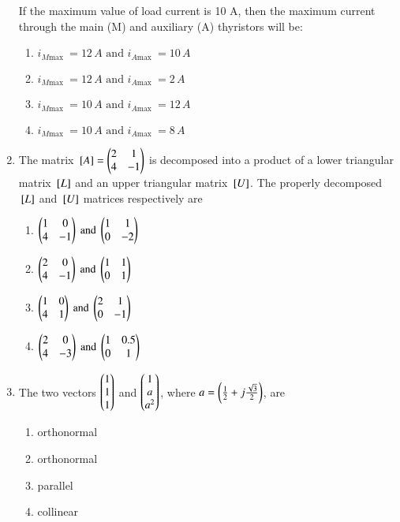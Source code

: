 \documentclass[journal]{IEEEtran}
\begin{document}
\begin{enumerate}[start=27]
If the maximum value of load current is 10 A, then the maximum current through the main (M) and auxiliary (A) thyristors will be:
\begin{multicols}{2}
\begin{enumerate}
\item $i_{M \text{max }} = 12\,A \text{ and } i_{A \text{max }} = 10\,A$
\item  $i_{M \text{max }} = 12\,A \text{ and } i_{A \text{max }} = 2\,A$
\item  $i_{M \text{max }} = 10\,A \text{ and } i_{A \text{max }} = 12\,A$
\item $i_{M \text{max }} = 10\,A \text{ and } i_{A \text{max }} = 8\,A$
\end{enumerate}
\end{multicols}

\item The matrix ${}\left[A\right]=\begin{pmatrix}2 & 1 \\ 4 & -1\end{pmatrix}$ is decomposed into a product of a lower triangular matrix ${}\left[L\right]$ and an upper triangular matrix ${}\left[U\right]$. The properly decomposed ${}\left[L\right]$ and ${}\left[U\right]$ matrices respectively are
\begin{multicols}{2}
\begin{enumerate}
\item $\begin{pmatrix}1 & 0 \\ 4 & -1\end{pmatrix} \text{ and } \begin{pmatrix}1 & 1 \\ 0 & -2 \end{pmatrix}$
\item $\begin{pmatrix}2 & 0 \\ 4 & -1\end{pmatrix} \text{ and } \begin{pmatrix}1 & 1 \\ 0 & 1 \end{pmatrix}$
\item $\begin{pmatrix}1 & 0 \\ 4 & 1\end{pmatrix} \text{ and } \begin{pmatrix}2& 1 \\ 0 & -1 \end{pmatrix}$
\item $\begin{pmatrix}2 & 0 \\ 4 & -3\end{pmatrix} \text{ and } \begin{pmatrix}1 & 0.5 \\ 0 & 1 \end{pmatrix}$
\end{enumerate}
\end{multicols}


\item The two vectors $\begin{pmatrix}1\\ 1\\ 1\end{pmatrix}$ and $\begin{pmatrix}1\\ a\\ a^2\end{pmatrix}$, where $a = \left( \frac{1}{2} + j\frac{\sqrt{3}}{2} \right)$, are
\begin{multicols}{4}
\begin{enumerate}
\item orthonormal
\item  orthonormal
\item  parallel
\item  collinear
\end{enumerate}
\end{multicols}


\end{enumerate}
\end{document}
